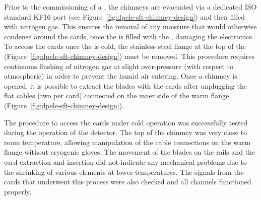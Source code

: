 Prior to the commissioning of a , the chimneys are evacuated via a dedicated ISO standard KF16 port (see Figure~\ref{fig:dpele-sft-chimney-design}) and then filled with nitrogen gas. This ensures the removal of %
any moisture that would otherwise condense around the  cards, once the  is filled with the \lar, damaging the electronics. To access the  cards once the  is cold, the stainless steel flange at the top of the  (Figure~\ref{fig:dpele-sft-chimney-design}) must be removed. This procedure requires continuous flushing of nitrogen gas at slight over-pressure (with respect to atmospheric) in order to prevent the humid air entering. %
Once a chimney is opened, it is possible to extract the blades with the  cards after unplugging the flat cables (two per card) connected on the inner side of the warm flange (Figure~\ref{fig:dpele-sft-chimney-design}).

The procedure to access the  cards under cold operation was successfully tested during the operation of the  detector. The %
top of the chimney was very close to room temperature, allowing manipulation of the cable connections on the warm \fdth flange without %
cryogenic gloves. The movement of the blades on the rails and the  card extraction and insertion did not indicate any mechanical problems %
due to the shrinking of various elements %
at lower temperatures.  The signals from the  cards that underwent %
this process were also checked and %
all channels functioned properly.


